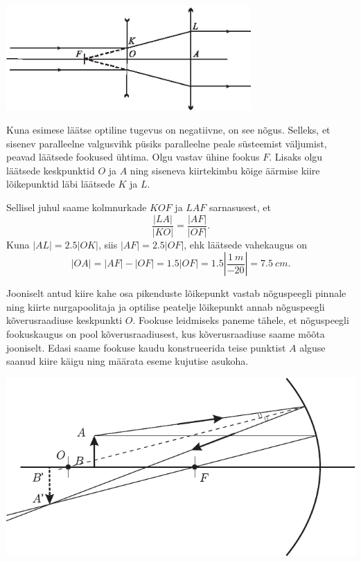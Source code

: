 \documentclass[10pt]{article}
\begin{document}
{%

\solu
\begin{center}
	\includegraphics[width=0.7\textwidth]{2010-v2g-03-laiendi.eps}
\end{center}

Kuna esimese läätse optiline tugevus on negatiivne, on see nõgus. Selleks, et sisenev paralleelne valgusvihk püsiks paralleelne peale süsteemist väljumist, peavad läätsede fookused ühtima. Olgu vastav ühine fookus $F$. Lisaks olgu läätsede keskpunktid $O$ ja $A$ ning siseneva kiirtekimbu kõige äärmise kiire lõikepunktid läbi läätsede $K$ ja $L$.

Sellisel juhul saame kolmnurkade $KOF$ ja $LAF$ sarnasusest, et 
\[
\frac{|LA|}{|KO|}=\frac{|AF|}{|OF|}.
\]
Kuna $|AL| = \num{2.5}|OK|$, siis $|AF| = \num{2.5}|OF|$, ehk läätsede vahekaugus on 
\[
|OA| = |AF| - |OF| = \num{1.5}|OF| = \num{1.5} \left\lvert\frac{\SI{1}{m}}{\num{-20}}\right\rvert = \SI{7.5}{cm}.
\]
\probend
\bigskip


\solu
Jooniselt antud kiire kahe osa pikenduste lõikepunkt vastab nõguspeegli pinnale ning kiirte nurgapoolitaja ja optilise peatelje lõikepunkt annab nõguspeegli kõverusraadiuse keskpunkti $O$. Fookuse leidmiseks paneme tähele, et nõguspeegli fookuskaugus on pool kõverusraadiusest, kus kõverusraadiuse saame mõõta jooniselt. Edasi saame fookuse kaudu konstrueerida teise punktist $A$ alguse saanud kiire käigu ning määrata eseme kujutise asukoha.

\begin{center}
	\includegraphics[width=\linewidth]{2006-v3g-02-lah}
\end{center}
\probend
\bigskip

}
\end{document}
